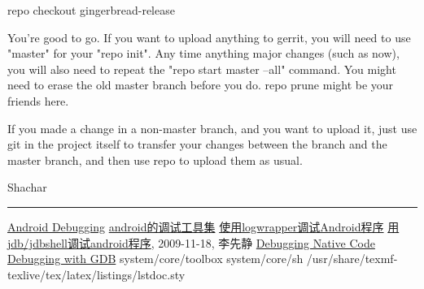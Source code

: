 \documentclass[a4paper,titlepage]{article}
\begin{document}
repo checkout gingerbread-release 

You're good to go. If you want to upload anything to gerrit, you will need to
use "master" for your "repo init". Any time anything major changes (such as
now), you will also need to repeat the "repo start master --all" command. You
might need to erase the old master branch before you do. repo prune might be
your friends here. 

If you made a change in a non-master branch, and you want to upload it, just
use git in the project itself to transfer your changes between the branch and
the master branch, and then use repo to upload them as usual. 

Shachar 



\noindent\rule[-1ex]{\textwidth}{3pt}
\begin{thebibliography}{Reference}
    \href{http://omappedia.org/wiki/Android_Debugging}{Android Debugging}
    \href{http://xy0811.spaces.live.com/Blog/cns!F8AECD2A067A6B17!1484.entry}{android的调试工具集}
     \href{http://hi.baidu.com/snownight/blog/item/91d55edfa2dc1f0149540399.html}{使用logwrapper调试Android程序}
     \href{http://www.limodev.cn/blog}{用jdb/jdbshell调试android程序}, 2009-11-18, 李先静
    \href{http://source.android.com/porting/debugging_native.html}{Debugging Native Code}
    \href{http://source.android.com/porting/debugging_gdb.html}{Debugging with GDB}
     system/core/toolbox
     system/core/sh
     /usr/share/texmf-texlive/tex/latex/listings/lstdoc.sty
\end{thebibliography}
\printindex
\end{document}
